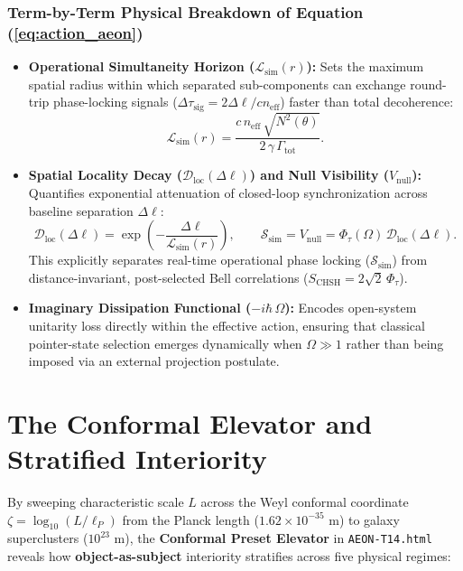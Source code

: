 \documentclass[11pt,a4paper]{article}
\begin{document}
\subsubsection*{Term-by-Term Physical Breakdown of Equation (\ref{eq:action_aeon})}
\begin{itemize}[leftmargin=1.5em]
    \item \textbf{Operational Simultaneity Horizon ($\mathcal{L}_{\text{sim}}(r)$):} Sets the maximum spatial radius within which separated sub-components can exchange round-trip phase-locking signals ($\Delta\tau_{\text{sig}} = 2\Delta\ell / c n_{\text{eff}}$) faster than total decoherence:
    \begin{equation}
    \mathcal{L}_{\text{sim}}(r) = \frac{c\,n_{\text{eff}}\,\sqrt{N^2(\theta)}}{2\,\gamma\,\Gamma_{\text{tot}}}.
    \end{equation}
    \item \textbf{Spatial Locality Decay ($\mathcal{D}_{\text{loc}}(\Delta\ell)$) and Null Visibility ($V_{\text{null}}$):} Quantifies exponential attenuation of closed-loop synchronization across baseline separation $\Delta\ell$:
    \begin{equation}
    \mathcal{D}_{\text{loc}}(\Delta\ell) = \exp\!\left(-\frac{\Delta\ell}{\mathcal{L}_{\text{sim}}(r)}\right), \qquad \mathcal{S}_{\text{sim}} = V_{\text{null}} = \Phi_\tau(\Omega)\,\mathcal{D}_{\text{loc}}(\Delta\ell).
    \end{equation}
    This explicitly separates real-time operational phase locking ($\mathcal{S}_{\text{sim}}$) from distance-invariant, post-selected Bell correlations ($S_{\text{CHSH}} = 2\sqrt{2}\,\Phi_\tau$).
    \item \textbf{Imaginary Dissipation Functional ($-i\hbar\,\Omega$):} Encodes open-system unitarity loss directly within the effective action, ensuring that classical pointer-state selection emerges dynamically when $\Omega \gg 1$ rather than being imposed via an external projection postulate.
\end{itemize}

\section{The Conformal Elevator and Stratified Interiority}

By sweeping characteristic scale $L$ across the Weyl conformal coordinate $\zeta = \log_{10}(L / \ell_P)$ from the Planck length ($1.62 \times 10^{-35}\text{ m}$) to galaxy superclusters ($10^{23}\text{ m}$), the \textbf{Conformal Preset Elevator} in \texttt{AEON-T14.html} reveals how \textbf{object-as-subject} interiority stratifies across five physical regimes:
\end{document}
